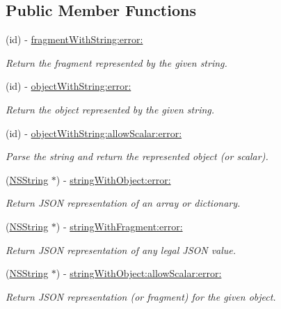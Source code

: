 \subsection*{Public Member Functions}
\begin{DoxyCompactItemize}
\item 
(id) -\/ \hyperlink{interface_s_b_j_s_o_n_aa88f7cb9ddc4ab7fd6e9fc0853e6da6a}{fragmentWithString:error:}
\begin{DoxyCompactList}\small\item\em Return the fragment represented by the given string. \item\end{DoxyCompactList}\item 
(id) -\/ \hyperlink{interface_s_b_j_s_o_n_a2b0ae389a765270663c1e1110bcef613}{objectWithString:error:}
\begin{DoxyCompactList}\small\item\em Return the object represented by the given string. \item\end{DoxyCompactList}\item 
(id) -\/ \hyperlink{interface_s_b_j_s_o_n_a942831fa293980ad189b72860055d32a}{objectWithString:allowScalar:error:}
\begin{DoxyCompactList}\small\item\em Parse the string and return the represented object (or scalar). \item\end{DoxyCompactList}\item 
(\hyperlink{class_n_s_string}{NSString} $\ast$) -\/ \hyperlink{interface_s_b_j_s_o_n_a830175bff0fbef8ccb82da852a154b48}{stringWithObject:error:}
\begin{DoxyCompactList}\small\item\em Return JSON representation of an array or dictionary. \item\end{DoxyCompactList}\item 
(\hyperlink{class_n_s_string}{NSString} $\ast$) -\/ \hyperlink{interface_s_b_j_s_o_n_a9289d1d536954874498df4143c55ee80}{stringWithFragment:error:}
\begin{DoxyCompactList}\small\item\em Return JSON representation of any legal JSON value. \item\end{DoxyCompactList}\item 
(\hyperlink{class_n_s_string}{NSString} $\ast$) -\/ \hyperlink{interface_s_b_j_s_o_n_adfe4a880ee09edf0c9d14508d79311d8}{stringWithObject:allowScalar:error:}
\begin{DoxyCompactList}\small\item\em Return JSON representation (or fragment) for the given object. \item\end{DoxyCompactList}\end{DoxyCompactItemize}


